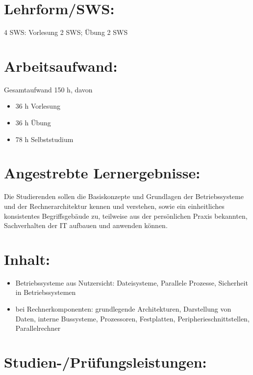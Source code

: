 \section*{Lehrform/SWS:}\label{lehrformsws-8}

4 SWS: Vorlesung 2 SWS; Übung 2 SWS

\section*{Arbeitsaufwand:}\label{arbeitsaufwand-8}

Gesamtaufwand 150 h, davon

\begin{itemize}
\tightlist
\item
  36 h Vorlesung
\item
  36 h Übung
\item
  78 h Selbststudium
\end{itemize}

\section*{Angestrebte
Lernergebnisse:}\label{angestrebte-lernergebnisse-8}

Die Studierenden sollen die Basiskonzepte und Grundlagen der
Betriebssysteme und der Rechnerarchitektur kennen und verstehen, sowie
ein einheitliches konsistentes Begriffsgebäude zu, teilweise aus der
persönlichen Praxis bekannten, Sachverhalten der IT aufbauen und
anwenden können.

\section*{Inhalt:}\label{inhalt-8}

\begin{itemize}
\tightlist
\item
  Betriebssysteme aus Nutzersicht: Dateisysteme, Parallele Prozesse,
  Sicherheit in Betriebssystemen
\item
  bei Rechnerkomponenten: grundlegende Architekturen, Darstellung von
  Daten, interne Bussysteme, Prozessoren, Festplatten,
  Peripherieschnittstellen, Parallelrechner
\end{itemize}

\section*{Studien-/Prüfungsleistungen:}\label{studien-pruxfcfungsleistungen-7}

